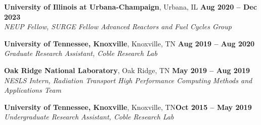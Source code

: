 \documentclass[margin,line]{resume}
\begin{document}
\begin{resume}
    \textbf{University of Illinois at Urbana-Champaign}, Urbana, IL \hfill \textbf{Aug 2020 -- Dec 2023} \\
    \vspace{-6mm}
        \textsl{NEUP Fellow, SURGE Fellow Advanced Reactors and Fuel Cycles Group} \\\vspace{-2mm}
        
    \textbf{University of Tennessee, Knoxville}, Knoxville, TN \hfill \textbf{Aug 2019 -- Aug 2020}\\
    \vspace{-6mm}
        \textsl{Graduate Research Assistant, Coble Research Lab} \\ \vspace{-2mm}
    
    \textbf{Oak Ridge National Laboratory}, Oak Ridge, TN \hfill \textbf{May 2019 -- Aug 2019}\\
    \vspace{-6mm}        
        \textsl{NESLS Intern, Radiation Transport High Performance Computing Methods and Applications Team}\\ \vspace{-2mm}              
    
    \textbf{University of Tennessee, Knoxville}, Knoxville, TN\hfill\textbf{Oct 2015 -- May 2019}\\
    \vspace{-6mm}            
        \textsl{Undergraduate Research Assistant, Coble Research Lab}\\\vspace{-1mm}

    


\end{resume}
\end{document}
